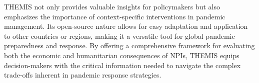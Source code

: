 \documentclass[msom,blindrev]{informs3} %
\begin{document}
THEMIS not only provides valuable insights for policymakers but also emphasizes the importance of context-specific interventions in pandemic management. Its open-source nature allows for easy adaptation and application to other countries or regions, making it a versatile tool for global pandemic preparedness and response. By offering a comprehensive framework for evaluating both the economic and humanitarian consequences of NPIs, THEMIS equips decision-makers with the critical information needed to navigate the complex trade-offs inherent in pandemic response strategies.


\clearpage

\begin{APPENDICES}


\end{APPENDICES}
\end{document}
